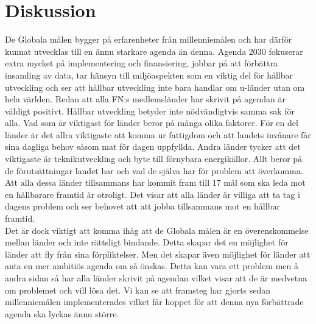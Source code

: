 \documentclass{report}
\begin{document}
\section{Diskussion}
De Globala målen bygger på erfarenheter från millenniemålen och har därför kunnat utvecklas till en ännu starkare agenda än denna. Agenda 2030 fokuserar extra mycket på implementering och finansiering, jobbar på att förbättra insamling av data, tar hänsyn till miljöaspekten som en viktig del för hållbar utveckling och ser att hållbar utveckling inte bara handlar om u-länder utan om hela världen. Redan att alla FN:s medlemsländer har skrivit på agendan är väldigt positivt. Hållbar utveckling betyder inte nödvändigtvis samma sak för alla. Vad som är viktigast för länder beror på många olika faktorer. För en del länder är det allra viktigaste att komma ur fattigdom och att landets invånare får sina dagliga behov såsom mat för dagen uppfyllda. Andra länder tycker att det viktigaste är teknikutveckling och byte till förnybara energikällor. Allt beror på de förutsättningar landet har och vad de själva har för problem att överkomma. Att alla dessa länder tillsammans har kommit fram till 17 mål som ska leda mot en hållbarare framtid är otroligt. Det visar att alla länder är villiga att ta tag i dagens problem och ser behovet att att jobba tillsammans mot en hållbar framtid. \\

Det är dock viktigt att komma ihåg att de Globala målen är en överenskommelse mellan länder och inte rättsligt bindande. Detta skapar det en möjlighet för länder att fly från sina förpliktelser. Men det skapar även möjlighet för länder att anta en mer ambitiös agenda om så önskas. Detta kan vara ett problem men å andra sidan så har alla länder skrivit på agendan vilket visar att de är medvetna om problemet och vill lösa det.  Vi kan se att framsteg har gjorts sedan millenniemålen implementerades vilket får hoppet för att denna nya förbättrade agenda ska lyckas ännu större. \\
\end{document}

